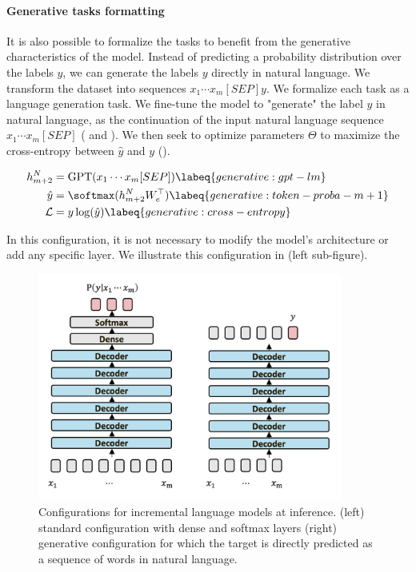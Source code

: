 \paragraph{Generative tasks formatting} It is also possible to formalize the tasks to benefit from the generative characteristics of the model. Instead of predicting a probability distribution over the labels $y$, we can generate the labels $y$ directly in natural language. We transform the dataset into sequences $x_1 \cdots x_m [SEP] y$. We formalize each task as a language generation task. We fine-tune the model to "generate" the label $y$ in natural language, as the continuation of the input natural language sequence $x_1 \cdots x_m [SEP]$ ( and ). We then seek to optimize \gpt parameters $\Theta$ to maximize the cross-entropy between $\hat{y}$ and $y$ ().

\begin{align}
    h_{m+2}^N &= \textrm{GPT}(x_1 \cdots x_m [SEP]) \labeq{generative:gpt-lm} \\
    \hat{y} &= \softmax(h_{m+2}^N W_e^{\top}) \labeq{generative:token-proba-m+1} \\
    \mathcal{L} &= y \log(\hat{y}) \labeq{generative:cross-entropy}
\end{align}

In this configuration, it is not necessary to modify the model's architecture or add any specific layer. We illustrate this configuration in  (left sub-figure).

\begin{figure}[!htb]
\begin{center}
\includegraphics[width=10cm]{images/generative-2.png}
\end{center}
\caption{Configurations for incremental language models at inference. (left) standard configuration with dense and softmax layers (right) generative configuration for which the target is directly predicted as a sequence of words in natural language.}
\end{figure}

